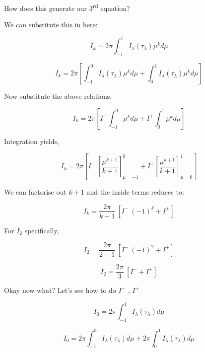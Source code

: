 \documentclass[12pt]{article}
\renewcommand{\_}{\kern-1.5pt\textunderscore\kern-1.5pt}
\begin{document}
\begin{itemize}
How does this generate our 3\textsuperscript{rd} equation?\par

We can substitute this in here:\par

 \[ I_{k}=2 \pi   \int _{-1}^{1}I_{ \lambda } \left(  \tau_{ \lambda } \right)  \mu ^{k} d \mu  \] \par

 \[ I_{k}=2 \pi   \left[  \int _{-1}^{0}I_{ \lambda } \left(  \tau_{ \lambda } \right)  \mu ^{k} d \mu + \int _{0}^{1}I_{ \lambda } \left(  \tau_{ \lambda } \right)  \mu ^{k} d \mu  \right]  \] \par

Now substitute the above relations,\par

 \[ I_{k}=2 \pi   \left[ I^{-} \int _{-1}^{0} \mu ^{k} d \mu +I^{+} \int _{0}^{1} \mu ^{k} d \mu  \right]  \] \par

Integration yields,\par

 \[ I_{k}=2 \pi   \left[ I^{-}~ \left[ \frac{ \mu ^{k+1}}{k+1 } \right] _{ \mu =-1}^{0}+I^{+} \left[ \frac{ \mu ^{k+1}}{k+1 } \right] _{ \mu =0}^{1} \right]  \] \par

We can factorise out  \( k+1  \) and the inside terms reduces to:\par

 \[ I_{k}=\frac{2 \pi }{k+1}~ \left[ I^{-}~ \left( -1 \right) ^{k}+I^{+} \right]  \] \par

For  \( I_{2} \)  specifically,\par

 \[ I_{2}=\frac{2 \pi }{2+1}~ \left[ I^{-}~ \left( -1 \right) ^{2}+I^{+} \right]  \] \par

 \[ I_{2}=\frac{2 \pi }{3}~ \left[ I^{-}+I^{+} \right]  \] \par

Okay now what? Let’s see how to do  \( I^{-} \) ,  \( I^{+} \) \par

 \[ I_{0}=2 \pi   \int _{-1}^{1}I_{ \lambda } \left(  \tau_{ \lambda } \right)  d \mu  \] \par

 \[ I_{0}=2 \pi   \int _{-1}^{0}I_{ \lambda } \left(  \tau_{ \lambda } \right)  d \mu +2 \pi   \int _{0}^{1}I_{ \lambda } \left(  \tau_{ \lambda } \right)  d \mu  \] \par


\end{itemize}
\end{document}
